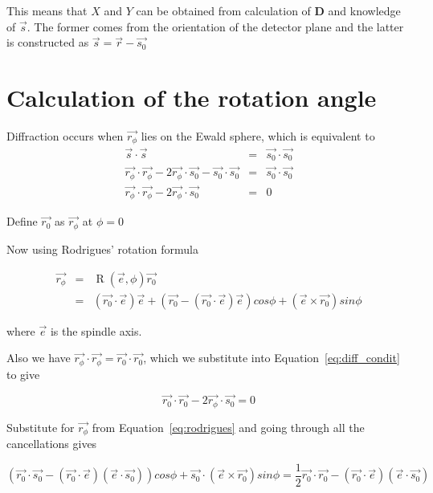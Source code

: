 \documentclass{article}
\begin{document}
This means that $X$ and $Y$ can be obtained from calculation of $\mathbf{D}$ and knowledge of $\vec{s}$. The former
comes from the orientation of the detector plane and the latter is constructed as $\vec{s} = \vec{r} - \vec{s_0}$


\section*{Calculation of the rotation angle}

Diffraction occurs when $\vec{r_\phi}$ lies on the Ewald sphere, which is equivalent to
\begin{eqnarray}
\label{eq:diff_condit}
\vec{s} \cdot \vec{s} & = & \vec{s_0} \cdot \vec{s_0} \nonumber \\
\vec{r_\phi} \cdot \vec{r_\phi} - 2 \vec{r_\phi} \cdot \vec{s_0} - \vec{s_0} \cdot \vec{s_0} & = & \vec{s_0} \cdot \vec{s_0} \nonumber \\
\vec{r_\phi} \cdot \vec{r_\phi} - 2 \vec{r_\phi} \cdot \vec{s_0} & = & 0
\end{eqnarray}

Define $\vec{r_0}$ as $\vec{r_\phi}$ at $\phi = 0$

Now using Rodrigues' rotation formula

\begin{eqnarray}
\label{eq:rodrigues}
\vec{r_\phi} & = & \operatorname{R}(\vec{e}, \phi) \vec{r_0} \nonumber \\
 & = & \left( \vec{r_0} \cdot \vec{e} \right) \vec{e} + 
       \left( \vec{r_0} - \left( \vec{r_0} \cdot \vec{e} \right) \vec{e} \right) cos{\phi} +
       \left( \vec{e} \times \vec{r_0} \right) sin{\phi}
\end{eqnarray}

where $\vec{e}$ is the spindle axis.

Also we have $\vec{r_\phi} \cdot \vec{r_\phi} = \vec{r_0} \cdot \vec{r_0}$, which we substitute into Equation~\ref{eq:diff_condit} to give

\begin{equation}
\vec{r_0} \cdot \vec{r_0} - 2 \vec{r_\phi} \cdot \vec{s_0}  =  0
\end{equation}

Substitute for $\vec{r_\phi}$ from Equation~\ref{eq:rodrigues} and going through all the cancellations gives

\begin{equation}
\label{eq:prediction}
\left(
  \vec{r_0} \cdot \vec{s_0} - \left( \vec{r_0} \cdot \vec{e} \right) \left( \vec{e} \cdot \vec{s_0} \right)
\right) cos{\phi} + 
\vec{s_0} \cdot \left( \vec{e} \times \vec{r_0} \right) sin{\phi} = 
\frac{1}{2} \vec{r_0} \cdot \vec{r_0} - \left( \vec{r_0} \cdot \vec{e} \right) \left( \vec{e} \cdot \vec{s_0} \right)
\end{equation}
\end{document}
